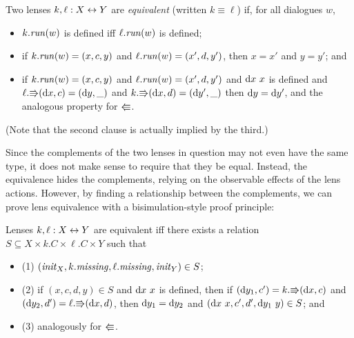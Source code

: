 \begin{defn}
Two lenses $k,\ell:X\leftrightarrow Y$ are {\em equivalent} (written $k \equiv \ell$) if,
for all dialogues $w$, 
\begin{itemize}
\item $k.\mathit{run}(w)$ is defined iff $\ell.\mathit{run}(w)$ is defined;
\item if $k.\mathit{run}(w)=(x,c,y)$ and $\ell.\mathit{run}(w)=(x',d,y')$, then $x=x'$ and
$y=y'$; and
\item if  $k.\mathit{run}(w)=(x,c,y)$ and $\ell.\mathit{run}(w)=(x',d,y')$ and $\textrm{d} x\ x$ is defined and $\ell.\mathord{\Rrightarrow}(\textrm{d} x,c)=(\textrm{d} y,\_)$ and 
 $k.\mathord{\Rrightarrow}(\textrm{d} x,d)=(\textrm{d} y',\_)$ then $\textrm{d} y=\textrm{d} y'$, and the analogous property for $\mathord{\Lleftarrow}$. 
\end{itemize} 
\end{defn}
(Note that the second clause is actually implied by the third.)

Since the complements of the two lenses in question may not even have
the same type, it does not make sense to require that they be
equal. Instead, the equivalence hides the complements, relying on the
observable effects of the lens actions. However, by finding a
relationship between the complements, we can prove lens
equivalence with a bisimulation-style proof principle:
\begin{theorem}\label{thm:bisim}
Lenses $k,\ell:X\leftrightarrow Y$ are equivalent iff there exists a relation
$S\subseteq X\times k.C\times \ell.C\times Y$ such that  
\iffull \begin{itemize} \fi
\iffull \item \else (1) \fi $(\mathit{init}_X,k.\mathit{missing},\ell.\mathit{missing},\mathit{init}_Y)\in S$;
\iffull \item \else (2) \fi if $(x,c,d,y)\in S$ and $\textrm{d} x\ x$ is defined, then if $(\textrm{d} y_1,c')=
k.\mathord{\Rrightarrow}(\textrm{d} x,c)$ and $(\textrm{d} y_2,d')=
\ell.\mathord{\Rrightarrow}(\textrm{d} x,d)$, then $\textrm{d} y_1=\textrm{d} y_2$ and $(\textrm{d} x\ x,c',d',\textrm{d} y_1\ y)\in
S$; and
\iffull \item \else (3) \fi analogously for $\mathord{\Lleftarrow}$. 
\iffull \end{itemize} \fi
\end{theorem}

